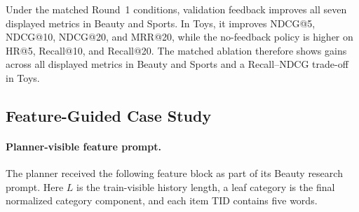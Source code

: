 Under the matched Round~1 conditions, validation feedback improves all seven displayed metrics in Beauty and Sports. In Toys, it improves NDCG@5, NDCG@10, NDCG@20, and MRR@20, while the no-feedback policy is higher on HR@5, Recall@10, and Recall@20. The matched ablation therefore shows gains across all displayed metrics in Beauty and Sports and a Recall--NDCG trade-off in Toys.

\subsection{Feature-Guided Case Study}

\paragraph{Planner-visible feature prompt.}
The planner received the following feature block as part of its Beauty research prompt. Here $L$ is the train-visible history length, a leaf category is the final normalized category component, and each item TID contains five words.

